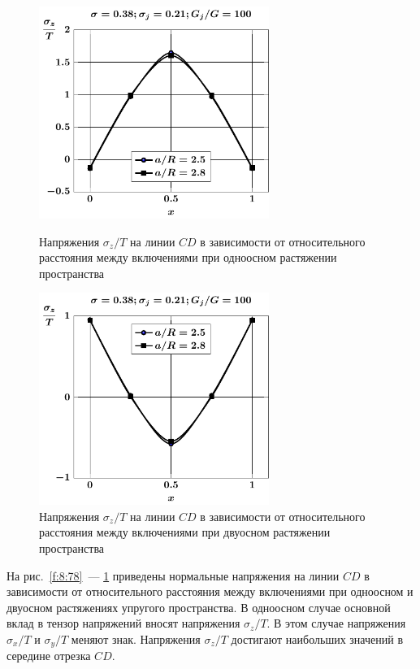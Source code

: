 \begin{figure}[h!]
\centering\footnotesize
\parbox[b]{7.5cm}{\centering\includegraphics[width=7.5cm]{inc13-a-d95-g100-t1-sig_z-cd.pdf}
\caption{Напряжения $\sigma_z/T$ на линии  $CD$ в зависимости от относительного расстояния между включениями при одноосном растяжении пространства
\label{f:8:82}}}\hfil\hfil
\parbox[b]{7.5cm}{\centering\includegraphics[width=7.5cm]{inc13-a-d95-g100-t2-sig_z-cd.pdf}
\caption{Напряжения $\sigma_z/T$ на линии  $CD$ в зависимости от относительного расстояния между включениями при двуосном растяжении пространства
\label{f:8:83}}}
\end{figure}

На рис.~\ref{f:8:78}~--- \ref{f:8:83} приведены нормальные напряжения на линии $CD$ в зависимости от относительного расстояния между включениями при одноосном и двуосном растяжениях упругого пространства. В одноосном случае основной вклад в тензор напряжений вносят напряжения $\sigma_z/T$. В этом случае напряжения $\sigma_x/T$ и $\sigma_y/T$ меняют знак. Напряжения $\sigma_z/T$ достигают наибольших значений в середине отрезка $CD$.

